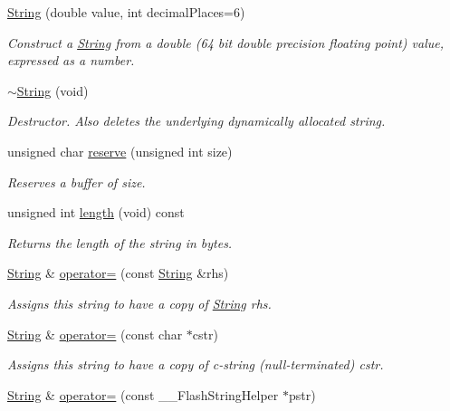 \begin{DoxyCompactItemize}
\hyperlink{class_string_a46e13b4608fbe763b4fc5bf22362078e}{String} (double value, int decimal\+Places=6)
\begin{DoxyCompactList}\small\item\em Construct a \hyperlink{class_string}{String} from a double (64 bit double precision floating point) value, expressed as a number. \end{DoxyCompactList}\item 
\hyperlink{class_string_ab4027f1abc8f8c0134f6098126de71e5}{$\sim$\+String} (void)
\begin{DoxyCompactList}\small\item\em Destructor. Also deletes the underlying dynamically allocated string. \end{DoxyCompactList}\item 
unsigned char \hyperlink{class_string_a138edcc762cb87649d81757d1e4ab419}{reserve} (unsigned int size)
\begin{DoxyCompactList}\small\item\em Reserves a buffer of size. \end{DoxyCompactList}\item 
unsigned int \hyperlink{class_string_a21691d4bac5ec852977018fef6fb9c8a}{length} (void) const
\begin{DoxyCompactList}\small\item\em Returns the length of the string in bytes. \end{DoxyCompactList}\item 
\hyperlink{class_string}{String} \& \hyperlink{class_string_a70b3aba8ac7a57e3bb48a52a5d64a88b}{operator=} (const \hyperlink{class_string}{String} \&rhs)
\begin{DoxyCompactList}\small\item\em Assigns this string to have a copy of \hyperlink{class_string}{String} rhs. \end{DoxyCompactList}\item 
\hyperlink{class_string}{String} \& \hyperlink{class_string_a0138caa55ac6d8b5bcd1fa7bb484a831}{operator=} (const char $\ast$cstr)
\begin{DoxyCompactList}\small\item\em Assigns this string to have a copy of c-\/string (null-\/terminated) cstr. \end{DoxyCompactList}\item 
\hyperlink{class_string}{String} \& \hyperlink{class_string_a965951ee729f850adb40d3c0997922bb}{operator=} (const \+\_\+\+\_\+\+Flash\+String\+Helper $\ast$pstr)

\end{DoxyCompactItemize}
